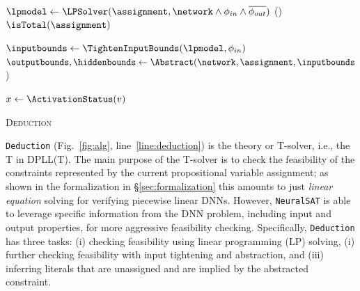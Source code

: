 \documentclass[oneside,11pt,dvipsnames]{book}
\numberwithin{equation}{section}
\theoremstyle{definition}
\theoremstyle{remark}
\newcommand{\tool}{\texttt{NeuralSAT}}
\begin{document}
\begin{algorithm}[t]
    \small


    \BlankLine

    $\lpmodel \leftarrow \LPSolver(\assignment, \network \land \phi_{in} \land \overline{\phi_{out}})$\;\label{line:lpsolver}
    \lIf{$\Solve(\lpmodel) \equiv \infeasible$}{\Return {\false}}\label{line:solve}
    \lIf(){$\isTotal(\assignment)$}{\Return {\true} }\label{line:full}


    $\inputbounds \leftarrow \TightenInputBounds(\lpmodel, \phi_{in})$\;\label{line:absstart}
    $\outputbounds, \hiddenbounds \leftarrow \Abstract(\network, \assignment, \inputbounds$)\;\label{line:abstraction}

    \label{line:checkfeasibility}

     {\label{line:infera}
      $x \leftarrow \ActivationStatus(v)$\;
        \label{line:inferb}
    }

    \Return {\true}\;\label{line:absend}

    \caption{\textsc{Deduction}}\label{alg:deduction}
\end{algorithm}

\texttt{Deduction} (Fig.~\ref{fig:alg}, line~\ref{line:deduction}) is the theory or T-solver, i.e., the T in DPLL(T). The main purpose of the T-solver is to check the feasibility of the constraints represented by the current propositional variable assignment; as shown in the formalization in \S\ref{sec:formalization} this amounts to just \emph{linear equation} solving for verifying piecewise linear DNNs. However, \tool{} is able to leverage specific information from the DNN problem, including input and output properties, for more aggressive feasibility checking.  Specifically, \texttt{Deduction} has three tasks: (i) checking feasibility using linear programming (LP) solving, (i) further checking feasibility with input tightening and abstraction, and (iii) inferring literals that are unassigned and are implied by the abstracted constraint.
\end{document}
